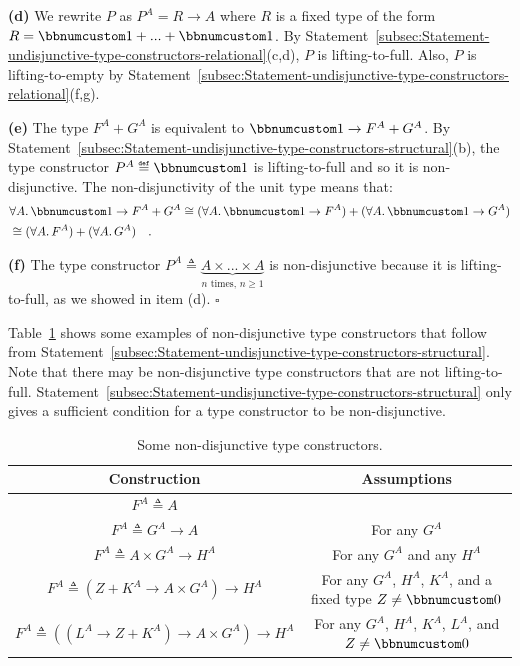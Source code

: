 \textbf{(d)} We rewrite $P$ as $P^{A}=R\rightarrow A$ where $R$
is a fixed type of the form $R=\bbnum 1+...+\bbnum 1$. By Statement~\ref{subsec:Statement-undisjunctive-type-constructors-relational}(c,d),
$P$ is lifting-to-full. Also, $P$ is lifting-to-empty by Statement~\ref{subsec:Statement-undisjunctive-type-constructors-relational}(f,g).

\textbf{(e)} The type $F^{A}+G^{A}$ is equivalent to $\bbnum 1\rightarrow F^{A}+G^{A}$.
By Statement~\ref{subsec:Statement-undisjunctive-type-constructors-structural}(b),
the type constructor $P^{A}\triangleq\bbnum 1$ is lifting-to-full
and so it is non-disjunctive. The non-disjunctivity of the unit type
means that:
\begin{align*}
 & \forall A.\,\bbnum 1\rightarrow F^{A}+G^{A}\cong(\forall A.\,\bbnum 1\rightarrow F^{A})+(\forall A.\,\bbnum 1\rightarrow G^{A})\\
 & \cong(\forall A.\,F^{A})+(\forall A.\,G^{A})\quad.
\end{align*}

\textbf{(f)} The type constructor $P^{A}\triangleq\underbrace{A\times...\times A}_{n\text{ times, }n\geq1}$
is non-disjunctive because it is lifting-to-full, as we showed in
item (d). $\square$

Table~\ref{tab:Non-disjunctive-type-constructions} shows some examples
of non-disjunctive type constructors that follow from Statement~\ref{subsec:Statement-undisjunctive-type-constructors-structural}.
Note that there may be non-disjunctive type constructors that are
not lifting-to-full. Statement~\ref{subsec:Statement-undisjunctive-type-constructors-structural}
only gives a sufficient condition for a type constructor to be non-disjunctive.

\begin{table}
\begin{centering}
\begin{tabular}{|c|c|}
\hline 
\textbf{\footnotesize{}Construction} & \textbf{\footnotesize{}Assumptions}\tabularnewline
\hline 
\hline 
{\footnotesize{}$F^{A}\triangleq A$} & \tabularnewline
\hline 
{\footnotesize{}$F^{A}\triangleq G^{A}\rightarrow A$} & {\footnotesize{}For any $G^{A}$}\tabularnewline
\hline 
{\footnotesize{}$F^{A}\triangleq A\times G^{A}\rightarrow H^{A}$} & {\footnotesize{}For any $G^{A}$ and any $H^{A}$}\tabularnewline
\hline 
{\footnotesize{}$F^{A}\triangleq(Z+K^{A}\rightarrow A\times G^{A})\rightarrow H^{A}$} & {\footnotesize{}For any $G^{A}$, $H^{A}$, $K^{A}$, and a fixed
type $Z\neq\bbnum 0$}\tabularnewline
\hline 
{\footnotesize{}$F^{A}\triangleq((L^{A}\rightarrow Z+K^{A})\rightarrow A\times G^{A})\rightarrow H^{A}$} & {\footnotesize{}For any $G^{A}$, $H^{A}$, $K^{A}$, $L^{A}$, and
$Z\neq\bbnum 0$}\tabularnewline
\hline 
\end{tabular}
\par\end{centering}
\caption{Some non-disjunctive type constructors.\label{tab:Non-disjunctive-type-constructions}}

\end{table}


